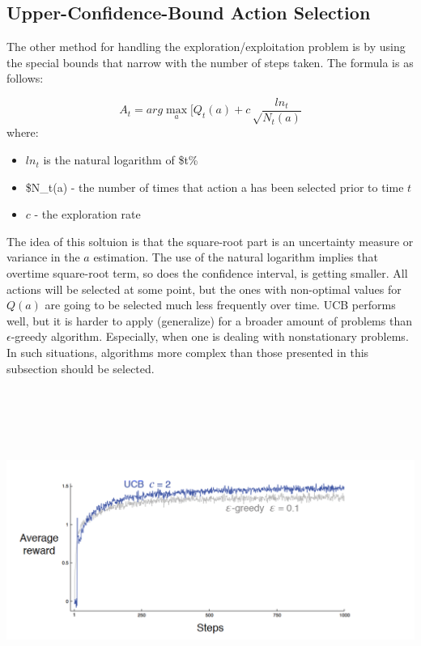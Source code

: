 \documentclass[]{article}
\providecommand{\tightlist}{%
  \setlength{\itemsep}{0pt}\setlength{\parskip}{0pt}}
\begin{document}
\subsection{Upper-Confidence-Bound Action
Selection}\label{upper-confidence-bound-action-selection}

The other method for handling the exploration/exploitation problem is by
using the special bounds that narrow with the number of steps taken. The
formula is as follows:

\[A_t = arg\max_a[Q_t(a)+c\sqrt\frac{ln_t}{N_t(a)}\] where:

\begin{itemize}
\tightlist
\item
  \(ln_t\) is the natural logarithm of \$t\%
\item
  \$N\_t(a) - the number of times that action a has been selected prior
  to time \(t\)
\item
  \(c\) - the exploration rate
\end{itemize}

The idea of this soltuion is that the square-root part is an uncertainty
measure or variance in the \(a\) estimation. The use of the natural
logarithm implies that overtime square-root term, so does the confidence
interval, is getting smaller. All actions will be selected at some
point, but the ones with non-optimal values for \(Q(a)\) are going to be
selected much less frequently over time. UCB performs well, but it is
harder to apply (generalize) for a broader amount of problems than
\(\epsilon\)-greedy algorithm. Especially, when one is dealing with
nonstationary problems. In such situations, algorithms more complex than
those presented in this subsection should be selected.

\includegraphics[height=4.16667in]{../img/ucb_vs_egreedy.png}
\end{document}
